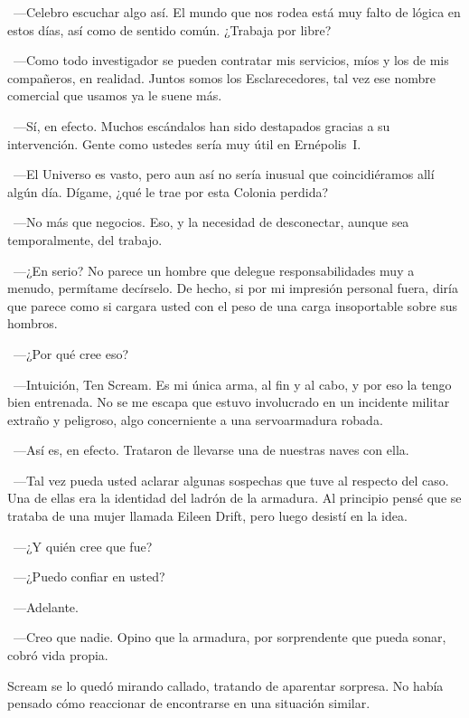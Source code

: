 ~---Celebro escuchar algo así. El mundo que nos rodea está muy falto de lógica en estos días, así como de sentido común. ¿Trabaja por libre?

~---Como todo investigador se pueden contratar mis servicios, míos y los de mis compañeros, en realidad. Juntos somos los Esclarecedores, tal vez ese nombre comercial que usamos ya le suene más.

~---Sí, en efecto. Muchos escándalos han sido destapados gracias a su intervención. Gente como ustedes sería muy útil en Ernépolis~I.

~---El Universo es vasto, pero aun así no sería inusual que coincidiéramos allí algún día. Dígame, ¿qué le trae por esta Colonia perdida?

~---No más que negocios. Eso, y la necesidad de desconectar, aunque sea temporalmente, del trabajo.

~---¿En serio? No parece un hombre que delegue responsabilidades muy a menudo, permítame decírselo. De hecho, si por mi impresión personal fuera, diría que parece como si cargara usted con el peso de una carga insoportable sobre sus hombros.

~---¿Por qué cree eso?

~---Intuición, Ten Scream. Es mi única arma, al fin y al cabo, y por eso la tengo bien entrenada. No se me escapa que estuvo involucrado en un incidente militar extraño y peligroso, algo concerniente a una servoarmadura robada.

~---Así es, en efecto. Trataron de llevarse una de nuestras naves con ella.

~---Tal vez pueda usted aclarar algunas sospechas que tuve al respecto del caso. Una de ellas era la identidad del ladrón de la armadura. Al principio pensé que se trataba de una mujer llamada Eileen Drift, pero luego desistí en la idea.

~---¿Y quién cree que fue?

~---¿Puedo confiar en usted?

~---Adelante.

~---Creo que nadie. Opino que la armadura, por sorprendente que pueda sonar, cobró vida propia.

Scream se lo quedó mirando callado, tratando de aparentar sorpresa. No había pensado cómo reaccionar de encontrarse en una situación similar.

